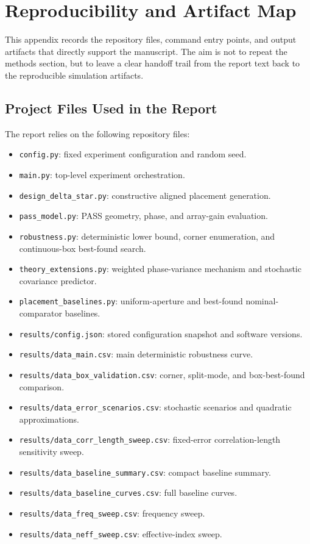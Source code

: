 \section{Reproducibility and Artifact Map}

This appendix records the repository files, command entry points, and output artifacts that directly support the manuscript. The aim is not to repeat the methods section, but to leave a clear handoff trail from the report text back to the reproducible simulation artifacts.

\subsection{Project Files Used in the Report}

The report relies on the following repository files:

\begin{itemize}
\item \texttt{config.py}: fixed experiment configuration and random seed.
\item \texttt{main.py}: top-level experiment orchestration.
\item \texttt{design\_delta\_star.py}: constructive aligned placement generation.
\item \texttt{pass\_model.py}: PASS geometry, phase, and array-gain evaluation.
\item \texttt{robustness.py}: deterministic lower bound, corner enumeration, and continuous-box best-found search.
\item \texttt{theory\_extensions.py}: weighted phase-variance mechanism and stochastic covariance predictor.
\item \texttt{placement\_baselines.py}: uniform-aperture and best-found nominal-comparator baselines.
\item \texttt{results/config.json}: stored configuration snapshot and software versions.
\item \texttt{results/data\_main.csv}: main deterministic robustness curve.
\item \texttt{results/data\_box\_validation.csv}: corner, split-mode, and box-best-found comparison.
\item \texttt{results/data\_error\_scenarios.csv}: stochastic scenarios and quadratic approximations.
\item \texttt{results/data\_corr\_length\_sweep.csv}: fixed-error correlation-length sensitivity sweep.
\item \texttt{results/data\_baseline\_summary.csv}: compact baseline summary.
\item \texttt{results/data\_baseline\_curves.csv}: full baseline curves.
\item \texttt{results/data\_freq\_sweep.csv}: frequency sweep.
\item \texttt{results/data\_neff\_sweep.csv}: effective-index sweep.
\end{itemize}

